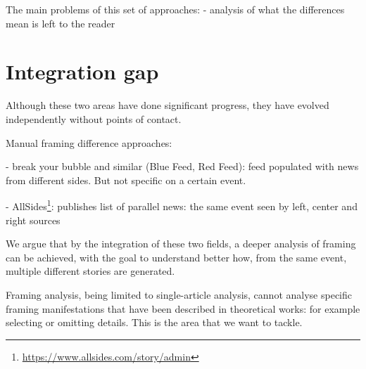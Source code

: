 The main problems of this set of approaches:
- analysis of what the differences mean is left to the reader





\section{Integration gap}
\label{sec:lit_gap}
Although these two areas have done significant progress, they have evolved independently without points of contact.

Manual framing difference approaches:

- break your bubble and similar (Blue Feed, Red Feed): feed populated with news from different sides. But not specific on a certain event.

- AllSides\footnote{\url{https://www.allsides.com/story/admin}}: publishes list of parallel news: the same event seen by left, center and right sources


We argue that by the integration of these two fields, a deeper analysis of framing can be achieved, with the goal to understand better how, from the same event, multiple different stories are generated.

Framing analysis, being limited to single-article analysis, cannot analyse specific framing manifestations that have been described in theoretical works: for example selecting or omitting details. This is the area that we want to tackle.









